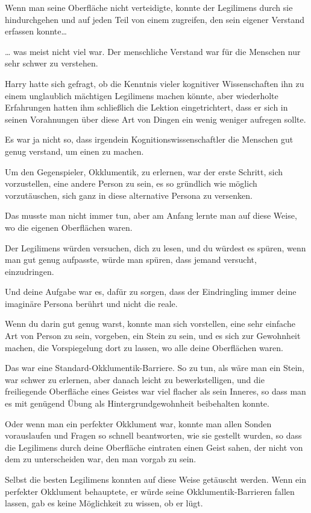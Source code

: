{Wenn man seine Oberfläche nicht verteidigte, konnte der Legilimens durch sie hindurchgehen und auf jeden Teil von einem zugreifen, den sein eigener Verstand erfassen konnte…

… was meist nicht viel war. Der menschliche Verstand war für die Menschen nur sehr schwer zu verstehen.

Harry hatte sich gefragt, ob die Kenntnis vieler kognitiver Wissenschaften ihn zu einem unglaublich mächtigen Legilimens machen könnte, aber wiederholte Erfahrungen hatten ihm schließlich die Lektion eingetrichtert, dass er sich in seinen Vorahnungen über diese Art von Dingen ein wenig weniger aufregen sollte.

Es war ja nicht so, dass irgendein Kognitionswissenschaftler die Menschen gut genug verstand, um einen zu machen.

Um den Gegenspieler, Okklumentik, zu erlernen, war der erste Schritt, sich vorzustellen, eine andere Person zu sein, es so gründlich wie möglich vorzutäuschen, sich ganz in diese alternative Persona zu versenken.

Das musste man nicht immer tun, aber am Anfang lernte man auf diese Weise, wo die eigenen Oberflächen waren.

Der Legilimens würden versuchen, dich zu lesen, und du würdest es spüren, wenn man gut genug aufpasste, würde man spüren, dass jemand versucht, einzudringen.

Und deine Aufgabe war es, dafür zu sorgen, dass der Eindringling immer deine imaginäre Persona berührt und nicht die reale.

Wenn du darin gut genug warst, konnte man sich vorstellen, eine sehr einfache Art von Person zu sein, vorgeben, ein Stein zu sein, und es sich zur Gewohnheit machen, die Vorspiegelung dort zu lassen, wo alle deine Oberflächen waren.

Das war eine Standard-Okklumentik-Barriere. So zu tun, als wäre man ein Stein, war schwer zu erlernen, aber danach leicht zu bewerkstelligen, und die freiliegende Oberfläche eines Geistes war viel flacher als sein Inneres, so dass man es mit genügend Übung als Hintergrundgewohnheit beibehalten konnte.

Oder wenn man ein perfekter Okklument war, konnte man allen Sonden vorauslaufen und Fragen so schnell beantworten, wie sie gestellt wurden, so dass die Legilimens durch deine Oberfläche eintraten einen Geist sahen, der nicht von dem zu unterscheiden war, den man vorgab zu sein.

Selbst die besten Legilimens konnten auf diese Weise getäuscht werden. Wenn ein perfekter Okklument behauptete, er würde seine Okklumentik-Barrieren fallen lassen, gab es keine Möglichkeit zu wissen, ob er lügt.

}
